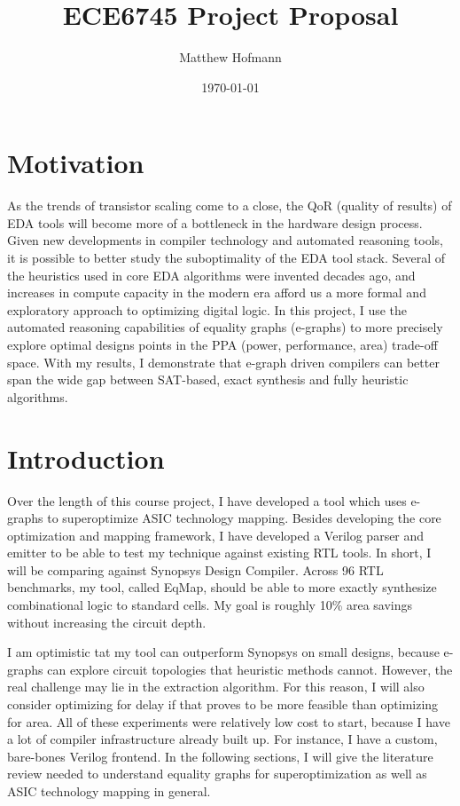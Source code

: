 \documentclass[10pt,letterpaper]{article}
\title{ECE6745 Project Proposal}
\author{Matthew Hofmann}
\date{\today}
\newcommand{\shortname}{EqMap}
\begin{document}
\maketitle


\section{Motivation}\label{sec:motivation}

As the trends of transistor scaling come to a close, the QoR (quality of
results) of EDA tools will become more of a bottleneck in the hardware design
process. Given new developments in compiler technology and automated reasoning
tools, it is possible to better study the suboptimality of the EDA tool stack.
Several of the heuristics used in core EDA algorithms were invented decades
ago, and increases in compute capacity in the modern era afford us a more
formal and exploratory approach to optimizing digital logic. In this project, I
use the automated reasoning capabilities of equality graphs (e-graphs) to more
precisely explore optimal designs points in the PPA (power, performance, area)
trade-off space. With my results, I demonstrate that e-graph driven compilers
can better span the wide gap between SAT-based, exact synthesis and fully
heuristic algorithms.

\section{Introduction}\label{sec:intro}

Over the length of this course project, I have developed a tool which uses
e-graphs to superoptimize ASIC technology mapping. Besides developing the core
optimization and mapping framework, I have developed a Verilog parser and
emitter to be able to test my technique against existing RTL tools. In short, I
will be comparing against Synopsys Design Compiler. Across 96 RTL benchmarks,
my tool, called \shortname{}, should be able to more exactly synthesize
combinational logic to standard cells. My goal is roughly 10\% area savings
without increasing the circuit depth.

I am optimistic tat my tool can outperform Synopsys on small designs, because
e-graphs can explore circuit topologies that heuristic methods cannot. However,
the real challenge may lie in the extraction algorithm. For this reason, I will
also consider optimizing for delay if that proves to be more feasible than
optimizing for area. All of these experiments were relatively low cost to
start, because I have a lot of compiler infrastructure already built up. For
instance, I have a custom, bare-bones Verilog frontend. In the following
sections, I will give the literature review needed to understand equality
graphs for superoptimization as well as ASIC technology mapping in general.
\end{document}
